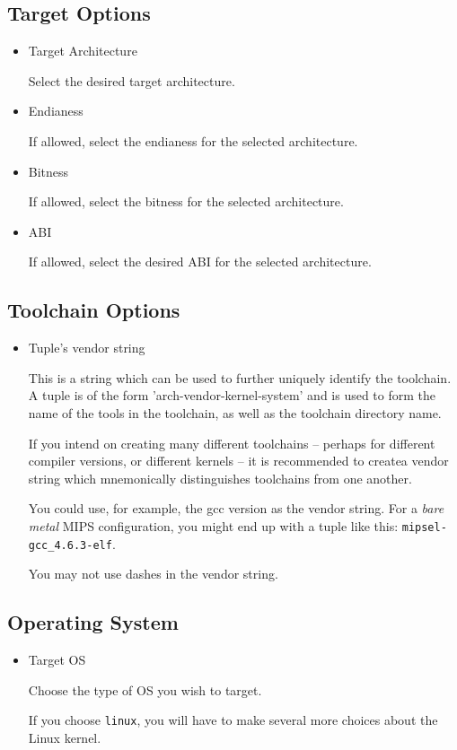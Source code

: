 \subsection{Target Options}
\begin{itemize}
\item{Target Architecture}

  Select the desired target architecture.

\item{Endianess}

  If allowed, select the endianess for the selected architecture.

\item{Bitness}

  If allowed, select the bitness for the selected architecture.

\item{ABI}

  If allowed, select the desired ABI for the selected architecture.

\end{itemize}

\subsection{Toolchain Options}
\begin{itemize}
\item{Tuple's vendor string}

  This is a string which can be used to further uniquely identify the
  toolchain.  A tuple is of the form 'arch-vendor-kernel-system' and
  is used to form the name of the tools in the toolchain, as well as
  the toolchain directory name.

  If you intend on creating many different toolchains -- perhaps for
  different compiler versions, or different kernels -- it is
  recommended to createa vendor string which mnemonically
  distinguishes toolchains from one another.

  You could use, for example, the gcc version as the vendor string.
  For a \emph{bare metal} MIPS configuration, you might end up with a
  tuple like this: \texttt{mipsel-gcc\_4.6.3-elf}.

  You may not use dashes in the vendor string.

\end{itemize}

\subsection{Operating System}
\begin{itemize}
\item{Target OS}

Choose the type of OS you wish to target.

If you choose \texttt{linux}, you will have to make several more
choices about the Linux kernel.
\end{itemize}

